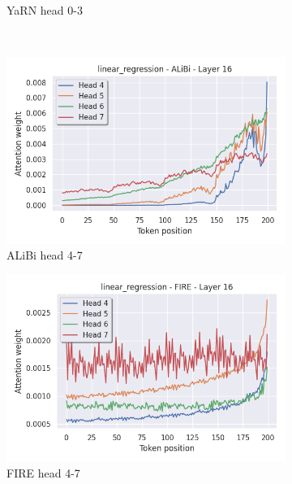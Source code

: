 \documentclass[letterpaper]{article} %
\begin{document}
\begin{figure}[tp]
\begin{subfigure}[t]{0.32\linewidth}
        \caption{YaRN head 0-3}
    \end{subfigure}
    \\
    \begin{subfigure}[t]{0.32\linewidth}
        \includegraphics[width=\linewidth]{AnonymousSubmission/LaTeX/imgs/analysis/alibi_head4.png}
        \caption{ALiBi head 4-7}
    \end{subfigure}
    \begin{subfigure}[t]{0.32\linewidth}
        \includegraphics[width=\linewidth]{AnonymousSubmission/LaTeX/imgs/analysis/fire_head4.png}
        \caption{FIRE head 4-7}
    \end{subfigure}
    \begin{subfigure}[t]{0.32\linewidth}

\end{subfigure}
\end{figure}
\end{document}
